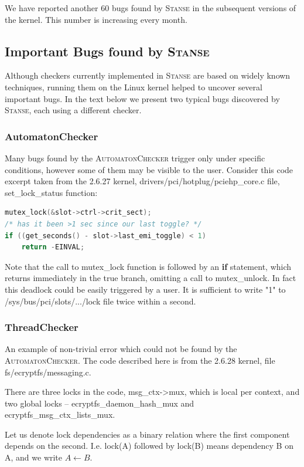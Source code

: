 \documentclass{llncs}
\newcommand{\Stanse}{\textsc{Stanse}\xspace}
\newcommand{\AC}{\textsc{AutomatonChecker}\xspace}
\begin{document}
We have reported another 60 bugs found by \Stanse in the subsequent versions
of the kernel. This number is increasing every month.

\subsection{Important Bugs found by \Stanse}
Although checkers currently implemented in \Stanse are based on widely known
techniques, running them on the Linux kernel helped to uncover several
important bugs. In the text below we present two typical bugs discovered by
\Stanse, each using a different checker.

\subsubsection{AutomatonChecker}
Many bugs found by the \AC trigger only under specific conditions, however
some of them may be visible to the user. Consider this code excerpt taken
from the 2.6.27 kernel, \textsf{drivers/pci/hotplug/pciehp\_core.c} file,
\textsf{set\_lock\_status} function:

\begin{lstlisting}[language=C]
mutex_lock(&slot->ctrl->crit_sect);
/* has it been >1 sec since our last toggle? */
if ((get_seconds() - slot->last_emi_toggle) < 1)
	return -EINVAL;
\end{lstlisting}

Note that the call to \textsf{mutex\_lock} function is followed by an \textbf{if}
statement, which returns immediately in the true branch, omitting a call to 
\textsf{mutex\_unlock}. In fact this
deadlock could be easily triggered by a user. It is sufficient to write "1" to
\textsf{/sys/bus/pci/slots/.../lock} file twice within a second.

\subsubsection{ThreadChecker}
An example of non-trivial error which could not be found by the \AC. The code
described here is from the 2.6.28 kernel, file \textsf{fs/ecryptfs/messaging.c}.

There are three locks in the code,
\textsf{msg\_ctx-\textgreater mux}, which is local per context, and two
global locks --
\textsf{ecryptfs\_daemon\_hash\_mux} and
\textsf{ecryptfs\_msg\_ctx\_lists\_mux}.

Let us denote lock dependencies as a binary relation where the first component
depends on the second. I.e. \textsf{lock(A)} followed by \textsf{lock(B)}
means dependency B on A, and we write $A\leftarrow B$.
\end{document}
